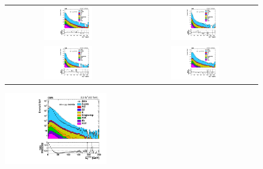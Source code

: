 \begin{figure}[!htb]
  \begin{center}
    \begin{tabular}{cc}
      \includegraphics[width=0.4\textwidth]{MET/figs/h_met_nupfcands_0013_pt_ll_signalregion_inclusive_passtrig.pdf} &
      \includegraphics[width=0.4\textwidth]{MET/figs/h_met_nupfcands_1316_pt_ll_signalregion_inclusive_passtrig.pdf} \\
      \includegraphics[width=0.4\textwidth]{MET/figs/h_met_nupfcands_1624_pt_ll_signalregion_inclusive_passtrig.pdf} &
      \includegraphics[width=0.4\textwidth]{MET/figs/h_met_nupfcands_2430_pt_ll_signalregion_inclusive_passtrig.pdf} \\
    \end{tabular}
    \includegraphics[width=0.4\textwidth]{MET/figs/h_met_nupfcands_30in_pt_ll_signalregion_inclusive_passtrig.pdf} 

\end{center}
\end{figure}
